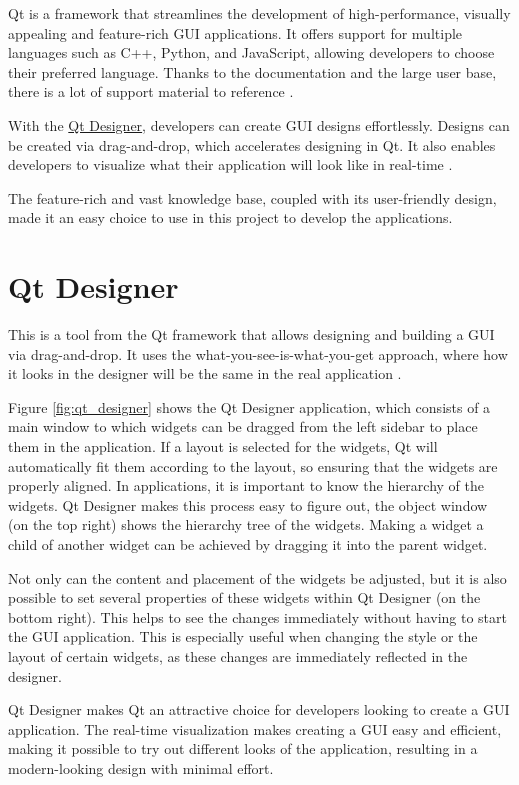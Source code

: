 Qt is a framework that streamlines the development of high-performance, visually appealing and feature-rich GUI applications. It offers support for multiple languages such as C++, Python, and JavaScript, allowing developers to choose their preferred language. Thanks to the documentation and the large user base, there is a lot of support material to reference \cite{qt}.

With the \hyperref[sub:qt_designer]{Qt Designer}, developers can create GUI designs effortlessly. Designs can be created via drag-and-drop, which accelerates designing in Qt. It also enables developers to visualize what their application will look like in real-time \cite{qt}.

The feature-rich and vast knowledge base, coupled with its user-friendly design, made it an easy choice to use in this project to develop the applications.


\section{Qt Designer}
\label{sub:qt_designer}

This is a tool from the Qt framework that allows designing and building a GUI via drag-and-drop. It uses the what-you-see-is-what-you-get approach, where how it looks in the designer will be the same in the real application \cite{qt}.

Figure \ref{fig:qt_designer} shows the Qt Designer application, which consists of a main window to which widgets can be dragged from the left sidebar to place them in the application. If a layout is selected for the widgets, Qt will automatically fit them according to the layout, so ensuring that the widgets are properly aligned. In applications, it is important to know the hierarchy of the widgets. Qt Designer makes this process easy to figure out, the object window (on the top right) shows the hierarchy tree of the widgets. Making a widget a child of another widget can be achieved by dragging it into the parent widget. 

Not only can the content and placement of the widgets be adjusted, but it is also possible to set several properties of these widgets within Qt Designer (on the bottom right). This helps to see the changes immediately without having to start the GUI application. This is especially useful when changing the style or the layout of certain widgets, as these changes are immediately reflected in the designer.

Qt Designer makes Qt an attractive choice for developers looking to create a GUI application. The real-time visualization makes creating a GUI easy and efficient, making it possible to try out different looks of the application, resulting in a modern-looking design with minimal effort.

